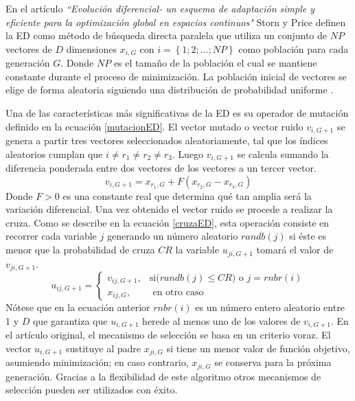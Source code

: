 En el artículo \textit{``Evolución diferencial- un esquema de adaptación simple y eficiente para la optimización global en espacios continuos"} Storn y Price definen la ED como método de búsqueda directa paralela que utiliza un conjunto de $NP$ vectores  de $D$ dimensiones $x_{i,G}$ con $i =\left\lbrace 1; 2; ...; NP\right\rbrace $  como población para cada generación $G$. Donde $NP$ es el tamaño de la población el cual se mantiene constante durante el proceso de minimización. La población inicial de vectores se elige de forma aleatoria siguiendo una distribución de probabilidad uniforme \cite{storn_differential_1997}.

Una de las características más significativas de la ED es su operador de mutación definido en la ecuación \ref{mutacionED}. El vector mutado o vector ruido $v_{i,G+1}$ se genera a partir tres vectores seleccionados aleatoriamente, tal que los índices aleatorios cumplan que $ i \neq r_1 \neq r_2 \neq r_3$. Luego $v_{i,G+1}$ se calcula sumando la diferencia ponderada entre dos vectores de los vectores a un tercer vector.
\begin{equation} \label{mutacionED}
v_{i,G+1} = x_{r_1,G} + F (x_{r_2 ,G}-x_{r_3,G})
\end{equation}
Donde $F >0$ es una constante real que determina qué tan amplia será la variación diferencial. Una vez obtenido el vector ruido se procede a realizar la cruza. Como se describe en la ecuación \ref{cruzaED}, esta operación consiste en recorrer cada variable $j$  generando un número aleatorio $randb(j)$  si éste es menor que la probabilidad de cruza $CR$ la variable $u_{ji,G+1}$ tomará el valor de  $v_{ji,G+1}$. 
\begin{equation} \label{cruzaED}
  u_{ij,G+1} = 
\begin{cases}
    v_{ij,G+1},& \text{si($randb(j) \leq CR$) o $j=rnbr(i)$}\\
    x_{ij,G},& \text{ en otro caso}
\end{cases}
\end{equation}
Nótese que en la ecuación anterior $rnbr(i)$ es un número entero aleatorio entre 1 y $D$ que garantiza que  $u_{i,G+1}$ herede al menos uno de los valores de $v_{i,G+1}$. En el artículo original, el mecanismo de selección se basa en un criterio voraz. El vector $u_{i,G+1}$ sustituye al padre  $x_{ji,G}$ si tiene un menor valor de función objetivo, asumiendo minimización; en caso contrario, $x_{ji,G}$ se conserva para la próxima generación. Gracias a la flexibilidad de este algoritmo otros mecanismos de selección pueden ser utilizados con éxito. 

